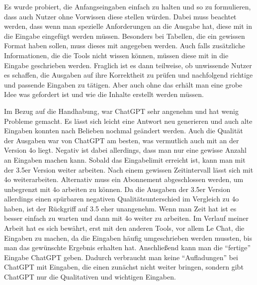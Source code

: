 Es wurde probiert, die Anfangseingaben einfach zu halten und so zu formulieren, dass auch Nutzer ohne Vorwissen 
diese stellen würden. Dabei muss beachtet werden, dass wenn man spezielle Anforderungen an die Ausgabe hat, 
diese mit in die Eingabe eingefügt werden müssen. Besonders bei Tabellen, die ein gewissen Format haben sollen, 
muss dieses mit angegeben werden. Auch falls zusätzliche Informationen, die die Tools nicht wissen können,
müssen diese mit in die Eingabe geschrieben werden. Fraglich ist es dann teilweise, ob unwissende Nutzer es 
schaffen, die Ausgaben auf ihre Korrektheit zu prüfen und nachfolgend richtige und passende Eingaben zu tätigen.
Aber auch ohne das erhält man eine grobe Idee was gefordert ist und wie die Inhalte erstellt werden müssen. 

Im Bezug auf die Handhabung, war ChatGPT sehr angenehm und hat wenig Probleme gemacht. Es lässt sich leicht 
eine Antwort neu generieren und auch alte Eingaben konnten nach Belieben nochmal geändert werden. Auch die 
Qualität der Ausgaben war von ChatGPT am besten, was vermutlich auch mit an der Version 4o liegt. Negativ ist 
dabei allerdings, dass man nur eine gewisse Anzahl an Eingaben machen kann. Sobald das Eingabelimit erreicht ist, kann 
man mit der 3.5er Version weiter arbeiten. Nach einem gewissen Zeitintervall lässt sich mit 4o weiterarbeiten. Alternativ 
muss ein Abonnement abgeschlossen werden, um unbegrenzt mit 4o arbeiten zu können. Da die Ausgaben der 3.5er Version allerdings einen spürbaren 
negativen Qualitätsunterschied im Vergleich zu 4o haben, ist der Rückgriff auf 3.5 eher unangenehm. Wenn man Zeit hat ist es besser 
einfach zu warten und dann mit 4o weiter zu arbeiten. Im Verlauf meiner Arbeit hat es sich bewährt, erst mit 
den anderen Tools, vor allem Le Chat, die Eingaben zu machen, da die Eingaben häufig umgeschrieben werden mussten, bis man
das gewünschte Ergebnis erhalten hat. Anschließend kann man die ``fertige'' Eingabe ChatGPT geben. Dadurch verbraucht man 
keine ``Aufladungen'' bei ChatGPT mit Eingaben, die einen zunächst nicht weiter bringen, sondern gibt ChatGPT nur die 
Qualitativen und wichtigen Eingaben.

